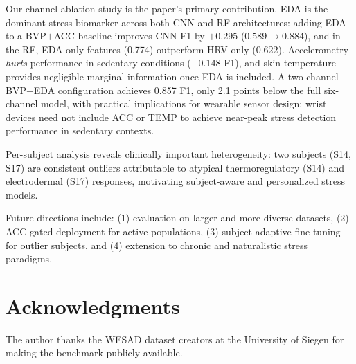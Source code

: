 \documentclass[10pt,twocolumn]{article}
\begin{document}
Our channel ablation study is the paper's primary contribution. EDA is the
dominant stress biomarker across both CNN and RF architectures: adding EDA
to a BVP$+$ACC baseline improves CNN F1 by $+0.295$ ($0.589 \to 0.884$),
and in the RF, EDA-only features (0.774) outperform HRV-only (0.622).
Accelerometry \emph{hurts}
performance in sedentary conditions ($-0.148$ F1), and skin temperature
provides negligible marginal information once EDA is included. A two-channel
BVP+EDA configuration achieves 0.857 F1, only 2.1 points below the full
six-channel model, with practical implications for wearable sensor design:
wrist devices need not include ACC or TEMP to achieve near-peak stress
detection performance in sedentary contexts.

Per-subject analysis reveals clinically important heterogeneity: two subjects
(S14, S17) are consistent outliers attributable to atypical thermoregulatory
(S14) and electrodermal (S17) responses, motivating subject-aware and
personalized stress models.

Future directions include: (1) evaluation on larger and more diverse datasets,
(2) ACC-gated deployment for active populations, (3) subject-adaptive
fine-tuning for outlier subjects, and (4) extension to chronic and
naturalistic stress paradigms.

\section*{Acknowledgments}
The author thanks the WESAD dataset creators at the University of Siegen
for making the benchmark publicly available.
\end{document}
